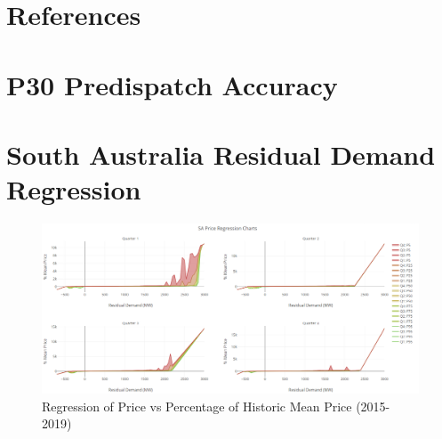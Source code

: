\documentclass[11pt,fleqn]{book} %
\let\cleardoublepage\clearpage
\begin{document}

\pagestyle{empty} %

\tableofcontents %
\listoffigures


\pagestyle{fancy} %









\chapter*{References}
\printbibliography[heading=none]
\appendix
{} %
\chapter{ P30 Predispatch Accuracy}

\chapter{ South Australia Residual Demand Regression}
\begin{figure}[H]
    \centering
    \includegraphics[width=\textwidth]{Pictures/sa_regression.png}
    \caption{Regression of Price vs Percentage of Historic Mean Price (2015-2019)}
    \label{fig:regression}
\end{figure}
 
\end{document}

